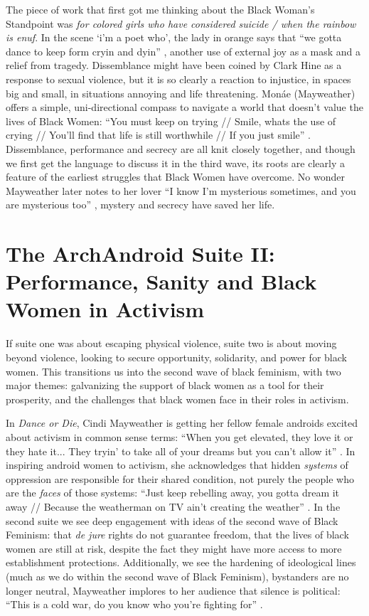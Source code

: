 \documentclass[a4paper, 11pt]{article} %
\begin{document}
The piece of work that first got me thinking about the Black Woman's Standpoint was \emph{for colored girls who have considered suicide / when the rainbow is enuf}.
In the scene `i'm a poet who', the lady in orange says that ``we gotta dance to keep form cryin and dyin'' \cite{forcoloredgirls}, another use of external joy as a mask and a relief from tragedy.
Dissemblance might have been coined by Clark Hine as a response to sexual violence, but it is so clearly a reaction to injustice, in spaces big and small, in situations annoying and life threatening.
Mon\'ae (Mayweather) offers a simple, uni-directional compass to navigate a world that doesn't value the lives of Black Women:
``You must keep on trying // Smile, whats the use of crying // You'll find that life is still worthwhile // If you just smile'' \cite{smile}.
Dissemblance, performance and secrecy are all knit closely together, and though we first get the language to discuss it in the third wave, its roots are clearly a feature of the earliest struggles that Black Women have overcome.
No wonder Mayweather later notes to her lover ``I know I'm mysterious sometimes, and you are mysterious too'' \cite{primetime},
mystery and secrecy have saved her life.


\section*{The ArchAndroid Suite II: Performance, Sanity and Black Women in Activism}

If suite one was about escaping physical violence, suite two is about moving beyond violence, looking to secure opportunity, solidarity, and power for black women.
This transitions us into the second wave of black feminism, with two major themes: galvanizing the support of black women as a tool for their prosperity, and the challenges that black women face in their roles in activism.

In \emph{Dance or Die}, Cindi Mayweather is getting her fellow female androids excited about activism in common sense terms:
``When you get elevated, they love it or they hate it... They tryin' to take all of your dreams but you can't allow it'' \cite{tightrope}.
In inspiring android women to activism, she acknowledges that hidden \emph{systems} of oppression are responsible for their shared condition, not purely the people who are the \emph{faces} of those systems:
``Just keep rebelling away, you gotta dream it away // Because the weatherman on TV ain't creating the weather'' \cite{danceordie}. 
In the second suite we see deep engagement with ideas of the second wave of Black Feminism: that \emph{de jure} rights do not guarantee freedom, that the lives of black women are still at risk, despite the fact they might have more access to more establishment protections.
Additionally, we see the hardening of ideological lines (much as we do within the second wave of Black Feminism), bystanders are no longer neutral, Mayweather implores to her audience that silence is political:
``This is a cold war, do you know who you're fighting for'' \cite{coldwar}.
\end{document}
